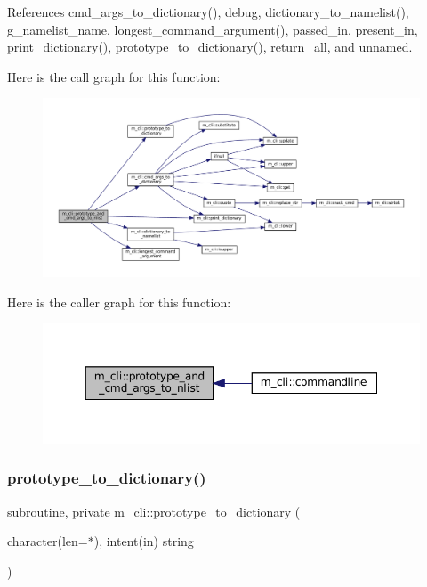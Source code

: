 References cmd\+\_\+args\+\_\+to\+\_\+dictionary(), debug, dictionary\+\_\+to\+\_\+namelist(), g\+\_\+namelist\+\_\+name, longest\+\_\+command\+\_\+argument(), passed\+\_\+in, present\+\_\+in, print\+\_\+dictionary(), prototype\+\_\+to\+\_\+dictionary(), return\+\_\+all, and unnamed.

Here is the call graph for this function\+:\nopagebreak
\begin{figure}[H]
\begin{center}
\leavevmode
\includegraphics[width=350pt]{namespacem__cli_ac77d70573b34ade2079cc4004a6acba5_cgraph}
\end{center}
\end{figure}
Here is the caller graph for this function\+:\nopagebreak
\begin{figure}[H]
\begin{center}
\leavevmode
\includegraphics[width=350pt]{namespacem__cli_ac77d70573b34ade2079cc4004a6acba5_icgraph}
\end{center}
\end{figure}
\mbox{\label{namespacem__cli_a8c62537a2d224364c9cb30005be819e9}} 
\subsubsection{\texorpdfstring{prototype\+\_\+to\+\_\+dictionary()}{prototype\_to\_dictionary()}}
{\footnotesize\ttfamily subroutine, private m\+\_\+cli\+::prototype\+\_\+to\+\_\+dictionary (\begin{DoxyParamCaption}\item[{character(len=$\ast$), intent(in)}]{string }\end{DoxyParamCaption})\hspace{0.3cm}{\ttfamily [private]}}




